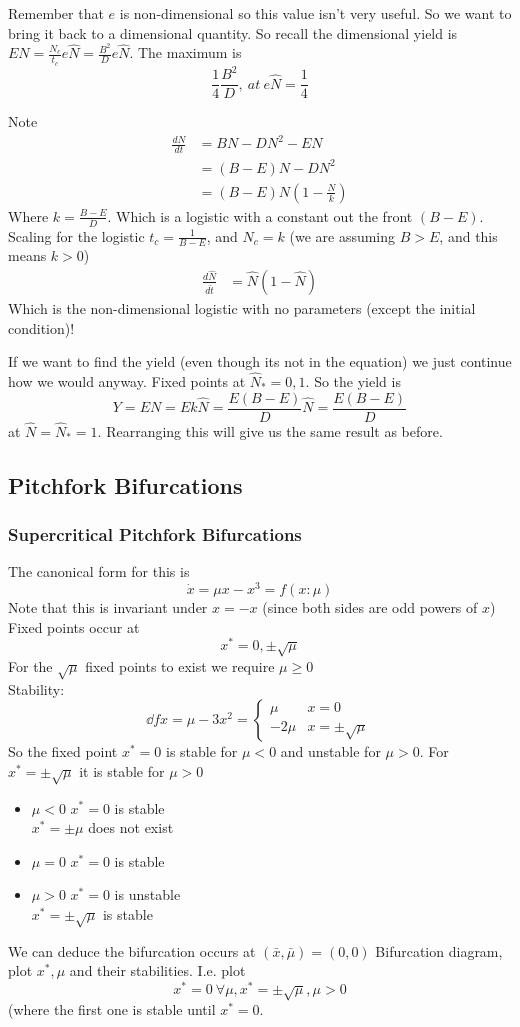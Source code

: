 \documentclass{X:/Documents/Coding/Latex/myassignment}
\begin{document}
Remember that $e$ is non-dimensional so this value isn't very useful. So we want to bring it back to a dimensional quantity. So recall the dimensional yield is $EN = \frac{N_c}{t_c} e\hat{N} = \frac{B^2}{D} e \hat{N}$.
The maximum is
\[\frac14 \frac{B^2}{D}, \ at \ e\hat{N} = \frac14\]


Note
\begin{align*}
\frac{dN}{dt} &= BN - DN^2 - EN\\
&= (B-E)N - DN^2\\
&= (B-E)N(1- \frac{N}{k})
\end{align*}
Where $k = \frac{B-E}{D}$. Which is a logistic with a constant out the front $(B-E)$. Scaling for the logistic $t_c = \frac{1}{B-E}$, and $N_c = k$ (we are assuming $B > E$, and this means $k > 0$)
\begin{align*}
    \frac{d\hat{N}}{d\hat{t}} &= \hat{N}(1-\hat{N})
\end{align*}
Which is the non-dimensional logistic with no parameters (except the initial condition)!

If we want to find the yield (even though its not in the equation) we just continue how we would anyway.
Fixed points at $\hat{N}_* = 0,1$. So the yield is 
\[Y= EN = Ek\hat{N} = \frac{E(B-E)}{D} \hat{N} = \frac{E(B-E)}{D} \]
at $\hat{N} = \hat{N}_* = 1$. Rearranging this will give us the same result as before.

\subsection{Pitchfork Bifurcations}

\subsubsection{Supercritical Pitchfork Bifurcations}
The canonical form for this is
\[\dot{x} = \mu x - x^3 = f(x:\mu)\]
Note that this is invariant under $x = -x$ (since both sides are odd powers of $x$)
Fixed points occur at
\[x^* = 0, \pm \sqrt{\mu}\]
For the $\sqrt{\mu}$ fixed points to exist we require $\mu \geq 0$\\
Stability:
\[\dd fx = \mu - 3x^2 = \begin{cases}\mu & x=0\\ -2\mu & x=\pm\sqrt{\mu}\end{cases}\]
So the fixed point $x^* = 0$ is stable for $\mu < 0$ and unstable for $\mu >0$. For $x^* = \pm \sqrt{\mu}$ it is stable for $\mu > 0$
\begin{itemize}
    \item $\mu < 0$
    $x^* = 0$ is stable\\
    $x^* = \pm \mu$ does not exist
    \item $\mu = 0$
    $x^* = 0$ is stable
    \item $\mu > 0$
    $x^* =0 $ is unstable\\
    $x^* = \pm \sqrt{\mu}$ is stable
\end{itemize}
We can deduce the bifurcation occurs at $(\bar{x},\bar{\mu}) = (0,0)$
Bifurcation diagram, plot $x^*,\mu$ and their stabilities.
I.e. plot
\[x^* = 0\ \forall \mu, x^* = \pm\sqrt{\mu}, \mu >0\]
(where the first one is stable until $x^*=0$.
\end{document}
